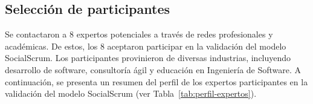 \subsection{Selección de participantes}
Se contactaron a 8 expertos potenciales a través de redes profesionales y académicas. De estos, los 8 aceptaron participar en la validación del modelo SocialScrum. Los participantes provinieron de diversas industrias, incluyendo desarrollo de software, consultoría ágil y educación en Ingeniería de Software. A continuación, se presenta un resumen del perfil de los expertos participantes en la validación del modelo SocialScrum (ver Tabla~\ref{tab:perfil-expertos}).

\begingroup
\scriptsize
\renewcommand{\arraystretch}{1.4}
\setlength{\tabcolsep}{3pt}


